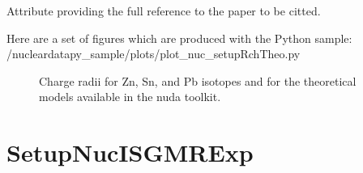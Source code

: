 \documentclass[letterpaper,10pt,english]{sphinxmanual}
\begin{document}
\begin{fulllineitems}
\begin{fulllineitems}
\end{fulllineitems}


\begin{fulllineitems}
\label{\detokenize{source/api/setup_nuc_rch_theo:nucleardatapy.nuc.setup_rch_theo.setupRchTheo.ref}}
\pysigstartsignatures
{}
\pysigstopsignatures
\sphinxAtStartPar
Attribute providing the full reference to the paper to be citted.

\end{fulllineitems}


\end{fulllineitems}


\sphinxAtStartPar
Here are a set of figures which are produced with the Python sample: /nucleardatapy\_sample/plots/plot\_nuc\_setupRchTheo.py

\begin{figure}[htbp]
\centering
\capstart

\noindent{}
\caption{Charge radii for Zn, Sn, and Pb isotopes and for the theoretical models available in the nuda toolkit.}\label{\detokenize{source/api/setup_nuc_rch_theo:id1}}\end{figure}

\sphinxstepscope


\section{SetupNucISGMRExp}
\label{\detokenize{source/api/setup_nuc_isgmr_exp:setupnucisgmrexp}}\label{\detokenize{source/api/setup_nuc_isgmr_exp::doc}}\label{\detokenize{source/api/setup_nuc_isgmr_exp:module-nucleardatapy.nuc.setup_isgmr_exp}}
\end{document}
